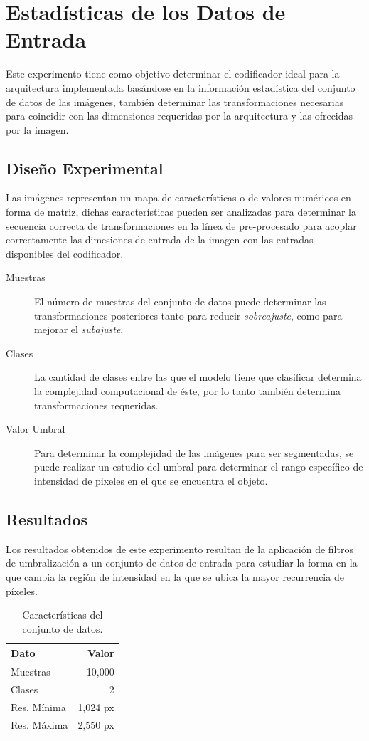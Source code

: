 \section{Estadísticas de los Datos de Entrada} 
Este experimento tiene como objetivo determinar el codificador ideal para la arquitectura implementada basándose en la información estadística del conjunto de datos de las imágenes, también determinar las transformaciones necesarias para coincidir con las dimensiones requeridas por la arquitectura y las ofrecidas por la imagen.

\subsection{Diseño Experimental}
Las imágenes representan un mapa de características o de valores numéricos en forma de matriz, dichas características pueden ser analizadas para determinar la secuencia correcta de transformaciones en la línea de pre-procesado para acoplar correctamente las dimesiones de entrada de la imagen con las entradas disponibles del codificador.
\begin{description}
    \item[Muestras] El número de muestras del conjunto de datos puede determinar las transformaciones posteriores tanto para reducir \emph{sobreajuste}, como para mejorar el \emph{subajuste}.
    \item[Clases] La cantidad de clases entre las que el modelo tiene que clasificar determina la complejidad computacional de éste, por lo tanto también determina transformaciones requeridas.
    \item[Valor Umbral] Para determinar la complejidad de las imágenes para ser segmentadas, se puede realizar un estudio del umbral para determinar el rango específico de intensidad de pixeles en el que se encuentra el objeto.
\end{description}

\subsection{Resultados}
Los resultados obtenidos de este experimento resultan de la aplicación de filtros de umbralización a un conjunto de datos de entrada para estudiar la forma en la que cambia la región de intensidad en la que se ubica la mayor recurrencia de píxeles.

\begin{table}[b]
    \centering
    \caption{Características del conjunto de datos.}
    \begin{tabular}{|l| r|}
        \hline
        \bf{Dato} & \bf{Valor} \\
        \hline
        Muestras & 10,000 \\
        \hline
        Clases & 2 \\
        \hline
        Res. Mínima & 1,024 px \\
        \hline
        Res. Máxima & 2,550 px \\
        \hline
    \end{tabular}
\end{table}

